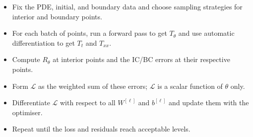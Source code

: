 \documentclass[11pt,letterpaper]{article}
\begin{document}
\begin{itemize}
    \item Fix the PDE, initial, and boundary data and choose sampling strategies for interior and boundary points.
    \item For each batch of points, run a forward pass to get $T_\theta$ and use automatic differentiation to get $T_t$ and $T_{xx}$.
    \item Compute $R_\theta$ at interior points and the IC/BC errors at their respective points.
    \item Form $\mathcal{L}$ as the weighted sum of these errors; $\mathcal{L}$ is a scalar function of $\theta$ only.
    \item Differentiate $\mathcal{L}$ with respect to all $W^{[\ell]}$ and $b^{[\ell]}$ and update them with the optimiser.
    \item Repeat until the loss and residuals reach acceptable levels.
\end{itemize}
\end{document}
